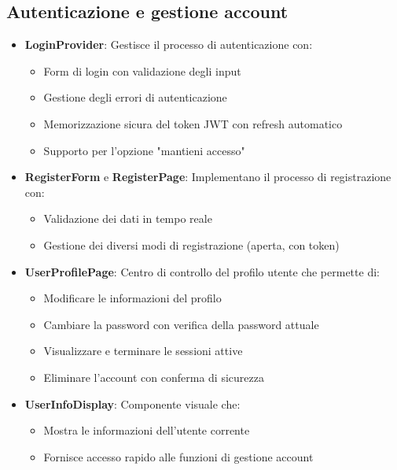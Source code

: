 \documentclass[11pt]{article}
\begin{document}
\subsection{Autenticazione e gestione account}
\begin{itemize}
    \item \textbf{LoginProvider}: Gestisce il processo di autenticazione con:
    \begin{itemize}
        \item Form di login con validazione degli input
        \item Gestione degli errori di autenticazione
        \item Memorizzazione sicura del token JWT con refresh automatico
        \item Supporto per l'opzione "mantieni accesso"
    \end{itemize}

    \item \textbf{RegisterForm} e \textbf{RegisterPage}: Implementano il processo di registrazione con:
    \begin{itemize}
        \item Validazione dei dati in tempo reale
        \item Gestione dei diversi modi di registrazione (aperta, con token)
    \end{itemize}

    \item \textbf{UserProfilePage}: Centro di controllo del profilo utente che permette di:
    \begin{itemize}
        \item Modificare le informazioni del profilo
        \item Cambiare la password con verifica della password attuale
        \item Visualizzare e terminare le sessioni attive
        \item Eliminare l'account con conferma di sicurezza
    \end{itemize}

    \item \textbf{UserInfoDisplay}: Componente visuale che:
    \begin{itemize}
        \item Mostra le informazioni dell'utente corrente
        \item Fornisce accesso rapido alle funzioni di gestione account
    \end{itemize}
\end{itemize}
\end{document}
